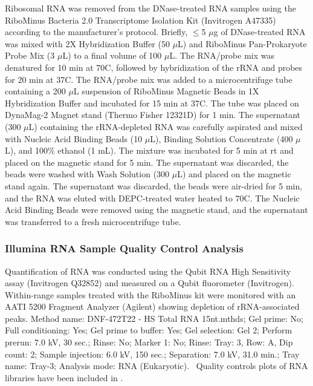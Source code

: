 Ribosomal RNA was removed from the DNase-treated RNA samples using the RiboMinus Bacteria 2.0 Transcriptome Isolation Kit (Invitrogen A47335) according to the manufacturer’s protocol.
Briefly, $\le$5 $\mu$g of DNase-treated RNA was mixed with 2X Hybridization Buffer (50 $\mu$L) and RiboMinus Pan-Prokaryote Probe Mix (3 $\mu$L) to a final volume of 100 $\mu$L.
The RNA/probe mix was denatured for 10 min at 70\textdegree C, followed by hybridization of the rRNA and probes for 20 min at 37\textdegree C.
The RNA/probe mix was added to a microcentrifuge tube containing a 200 $\mu$L suspension of RiboMinus Magnetic Beads in 1X Hybridization Buffer and incubated for 15 min at 37\textdegree C.
The tube was placed on DynaMag-2 Magnet stand (Thermo Fisher 12321D) for 1 min.
The supernatant (300 $\mu$L) containing the rRNA-depleted RNA was carefully aspirated and mixed with Nucleic Acid Binding Beads (10 $\mu$L), Binding Solution Concentrate (400 $\mu$L), and 100\% ethanol (1 mL).
The mixture was incubated for 5 min at rt and placed on the magnetic stand for 5 min.
The supernatant was discarded, the beads were washed with Wash Solution (300 $\mu$L) and placed on the magnetic stand again.
The supernatant was discarded, the beads were air-dried for 5 min, and the RNA was eluted with DEPC-treated water heated to 70\textdegree C.
The Nucleic Acid Binding Beads were removed using the magnetic stand, and the supernatant was transferred to a fresh microcentrifuge tube.

\subsubsection{Illumina RNA Sample Quality Control Analysis} \label{sec:methods-ill-qc}

Quantification of RNA was conducted using the Qubit RNA High Sensitivity assay (Invitrogen Q32852) and measured on a Qubit fluorometer (Invitrogen).
Within-range samples treated with the RiboMinus kit were monitored with an AATI 5200 Fragment Analyzer (Agilent) showing depletion of rRNA-associated peaks.
Method name: DNF-472T22 - HS Total RNA 15nt.mthds; Gel prime: No; Full conditioning: Yes; Gel prime to buffer: Yes; Gel selection: Gel 2; Perform prerun: 7.0 kV, 30 sec.; Rinse: No; Marker 1: No; Rinse: Tray: 3, Row: A, Dip count: 2; Sample injection: 6.0 kV, 150 sec.; Separation: 7.0 kV, 31.0 min.; Tray name: Tray-3; Analysis mode: RNA (Eukaryotic).%
~Quality controls plots of RNA libraries have been included in \sdqc.

